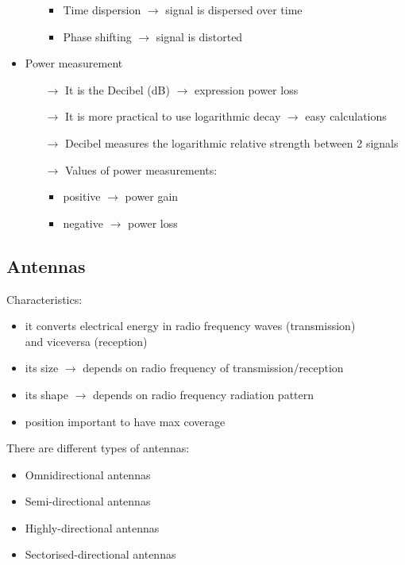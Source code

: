 \begin{itemize}
\begin{itemize}
\begin{itemize}
            \item Time dispersion $\rightarrow$ signal is dispersed over time
            \item Phase shifting $\rightarrow$ signal is distorted
        \end{itemize}
    \end{itemize}
    \item Power measurement
    \begin{itemize}
        \item[$\rightarrow$] It is the Decibel (dB) $\rightarrow$ expression
        power loss
        \item[$\rightarrow$] It is more practical to use logarithmic decay
        $\rightarrow$ easy calculations
        \item[$\rightarrow$] Decibel measures the logarithmic relative strength
        between 2 signals
        \item[$\rightarrow$] Values of power measurements:
        \begin{itemize}
            \item positive $\rightarrow$ power gain
            \item negative $\rightarrow$ power loss
        \end{itemize}
    \end{itemize}
\end{itemize}

\subsection{Antennas}

Characteristics:
\vspace{-0.1cm}\begin{itemize}
    \item it converts electrical energy in radio
    frequency waves (transmission)\\and viceversa (reception)
    \item its size $\rightarrow$ depends on radio
    frequency of transmission/reception
    \item its shape $\rightarrow$ depends on radio
    frequency radiation pattern
    \item position important to have max coverage
\end{itemize}

There are different types of antennas:
\begin{itemize}
    \item Omnidirectional antennas
    \item Semi-directional antennas
    \item Highly-directional antennas
    \item Sectorised-directional antennas
\end{itemize} 
